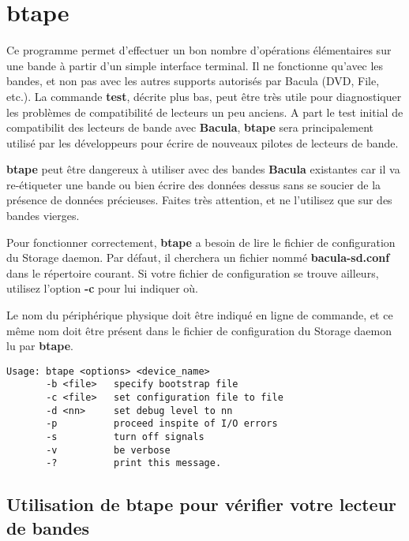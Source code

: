 \section{btape}
\label{btape}

Ce programme permet d'effectuer un bon nombre d'opérations élémentaires sur
une bande à partir d'un simple interface terminal. Il ne fonctionne qu'avec les
bandes, et non pas avec les autres supports autorisés par Bacula 
(DVD, File, etc.). La commande {\bf test}, décrite plus bas, peut être très
utile pour diagnostiquer les problèmes de compatibilité de lecteurs un peu 
anciens. A part le test initial de compatibilit des lecteurs de bande avec 
{\bf Bacula}, {\bf btape} sera principalement utilisé par les développeurs
pour écrire de nouveaux pilotes de lecteurs de bande.

{\bf btape} peut être dangereux à utiliser avec des bandes {\bf Bacula} 
existantes car il va re-étiqueter une bande ou bien écrire des données dessus
sans se soucier de la présence de données précieuses. Faites très attention, et
ne l'utilisez que sur des bandes vierges.

Pour fonctionner correctement, {\bf btape} a besoin de lire le fichier de 
configuration du Storage daemon. Par défaut, il cherchera un fichier nommé
{\bf bacula-sd.conf} dans le répertoire courant. Si votre fichier de 
configuration se trouve ailleurs, utilisez l'option {\bf -c} pour lui indiquer
où.

Le nom du périphérique physique doit être indiqué en ligne de commande, et ce
même nom doit être présent dans le fichier de configuration du Storage daemon
lu par {\bf btape}. 

\footnotesize
\begin{verbatim}
Usage: btape <options> <device_name>
       -b <file>   specify bootstrap file
       -c <file>   set configuration file to file
       -d <nn>     set debug level to nn
       -p          proceed inspite of I/O errors
       -s          turn off signals
       -v          be verbose
       -?          print this message.
\end{verbatim}
\normalsize

\subsection{Utilisation de btape pour vérifier votre lecteur de bandes}

